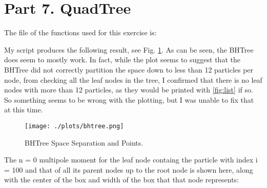 \section{Part 7. QuadTree}

The file of the functions used for this exercise is:



My script produces the following result, see Fig. \ref{fig:bhtree}. As can be seen, the BHTree does seem to mostly work.
In fact, while the plot seems to suggest that the BHTree did not correctly partition the space down to less than 12 particles
per node, from checking all the leaf nodes in the tree, I confirmed that there is no leaf nodes with more than 12 particles, as they would be
printed with \ref{fig:list} if so. So something seems to be wrong with the plotting, but I was unable to fix that at this time.

\begin{figure}[h!]
  \centering
  \texttt{[image: ./plots/bhtree.png]}
  \caption{BHTree Space Separation and Points.}
  \label{fig:bhtree}
\end{figure}


The n = 0 multipole moment for the leaf node containg the particle with index i = 100 and that of
all its parent nodes up to the root node is shown here, along with the center of the box and width of the box that that
node represents:

\label{fig:list}

